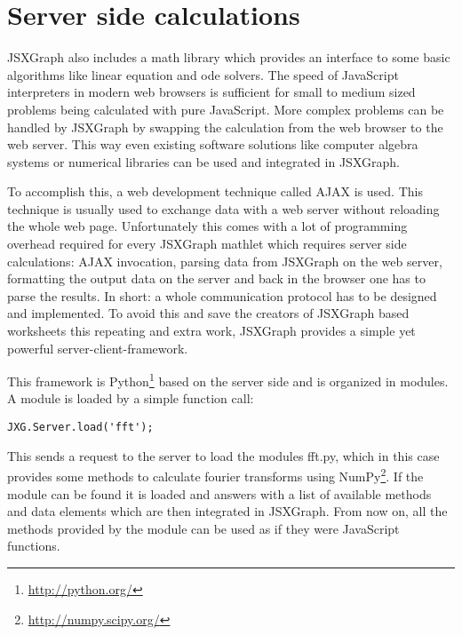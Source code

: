 \documentclass[12pt,a4paper]{article}%
\begin{document}
\section{Server side calculations}\label{sec:loci}

JSXGraph also includes a math library which provides an interface to some basic algorithms like linear equation and ode
solvers. The speed of JavaScript interpreters in modern web browsers is sufficient for small to medium sized problems
being calculated with pure JavaScript. More complex problems can be handled by JSXGraph by swapping the calculation from
the web browser to the web server. This way even existing software solutions like computer algebra systems or numerical
libraries can be used and integrated in JSXGraph.

To accomplish this, a web development technique called AJAX is used. This technique is usually used to exchange data
with a web server without reloading the whole web page. Unfortunately this comes with a lot of programming overhead
required for every JSXGraph mathlet which requires server side calculations: AJAX invocation, parsing data from JSXGraph
on the web server, formatting the output data on the server and back in the browser one has to parse the results. In
short: a whole communication protocol has to be designed and implemented. To avoid this and save the creators of JSXGraph
based worksheets this repeating and extra work, JSXGraph provides a simple yet powerful server-client-framework.

This framework is Python\footnote{\href{http://python.org/}{http://python.org/}} based on the server side and is
organized in modules. A module is loaded by a simple function call:

\begin{verbatim}
JXG.Server.load('fft');
\end{verbatim}

This sends a request to the server to load the modules fft.py, which in this case provides some methods to calculate
fourier transforms using NumPy\footnote{\href{http://numpy.scipy.org/}{http://numpy.scipy.org/}}. If the module can be
found it is loaded and answers with a list of available methods and data elements which are then integrated in JSXGraph.
From now on, all the methods provided by the module can be used as if they were JavaScript functions.
\end{document}
